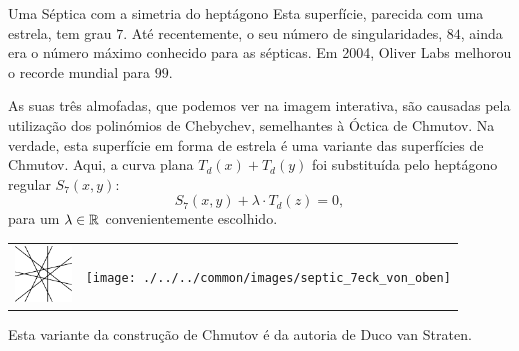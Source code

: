 \begin{surferPage}{Uma S\'eptica com a simetria do hept\'agono}
    Esta superf\'icie, parecida com uma estrela, tem grau $7$.  
    At\'e recentemente, o seu n\'umero de singularidades, $84$, ainda era o n\'umero m\'aximo conhecido para as s\'epticas.
    Em 2004, Oliver Labs melhorou o recorde mundial para $99$.
  
  
 As suas tr\^es almofadas, que podemos ver na imagem interativa, 
    s\~ao causadas pela utiliza\c c\~ao dos polin\'omios de Chebychev, semelhantes \`a \' Octica de Chmutov. 
    Na verdade, esta superf\'icie em forma de estrela \'e uma variante das superf\'icies de Chmutov.
    Aqui, a curva plana $T_d(x)+T_d(y)$ foi substitu\'ida pelo hept\'agono regular
    $S_7(x,y)$: 
   \[S_7(x,y) + \lambda \cdot T_d(z) = 0,\]
    para um $\lambda\in{\mathbb R}$ convenientemente escolhido. 
    \vspace*{-0.3em}
    \begin{center}
      \begin{tabular}{c@{\qquad}c}
        \includegraphics[height=1.5cm]{./../../common/images/labsseptic1.pdf}
        &
        \texttt{[image: ./../../common/images/septic\_7eck\_von\_oben]}
      \end{tabular}
    \end{center}
    \vspace*{-0.3em}   
   Esta variante da constru\c c\~ao de Chmutov \'e da autoria de Duco van Straten.
\end{surferPage}
